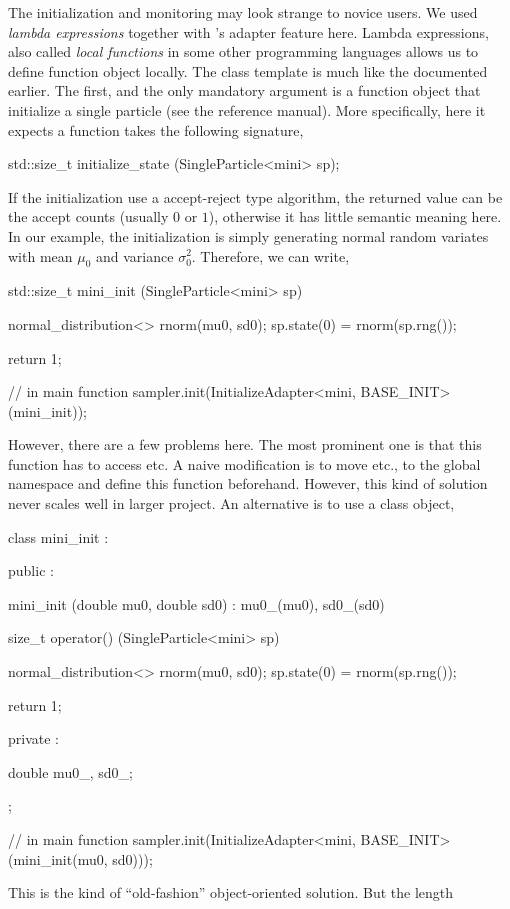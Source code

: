 The initialization and monitoring may look strange to novice \cpp users. We
used \cppoo{} \emph{lambda expressions} together with \vsmc's adapter feature
here. Lambda expressions, also called \emph{local functions} in some other
programming languages allows us to define function object locally. The
 class template is much like the 
documented earlier. The first, and the only mandatory argument is a function
object that initialize a single particle (see the reference manual). More
specifically, here it expects a function takes the following signature,
\begin{cppcode}
std::size_t initialize_state (SingleParticle<mini> sp);
\end{cppcode}
If the initialization use a accept-reject type algorithm, the returned value
can be the accept counts (usually $0$ or $1$), otherwise it has little
semantic meaning here. In our example, the initialization is simply generating
normal random variates with mean $\mu_0$ and variance $\sigma_0^2$. Therefore,
we can write,
\begin{cppcode}
std::size_t mini_init (SingleParticle<mini> sp)
{
    normal_distribution<> rnorm(mu0, sd0);
    sp.state(0) = rnorm(sp.rng());

    return 1;
}

// in main function
sampler.init(InitializeAdapter<mini, BASE_INIT>(mini_init));
\end{cppcode}
However, there are a few problems here. The most prominent one is that this
function has to access  etc. A naive modification is to move
 etc., to the global namespace and define this function beforehand.
However, this kind of solution never scales well in larger project. An
alternative is to use a class object,
\begin{cppcode}
class mini_init :
{
    public :

    mini_init (double mu0, double sd0) : mu0_(mu0), sd0_(sd0) {}

    size_t operator() (SingleParticle<mini> sp)
    {
        normal_distribution<> rnorm(mu0, sd0);
        sp.state(0) = rnorm(sp.rng());

        return 1;
    }

    private :

    double mu0_, sd0_;
};

// in main function
sampler.init(InitializeAdapter<mini, BASE_INIT>(mini_init(mu0, sd0)));
\end{cppcode}
This is the kind of ``old-fashion'' object-oriented solution. But the length

